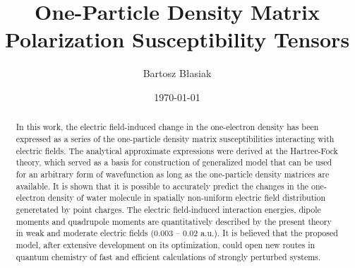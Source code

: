 \documentclass[aip,amsmath,amssymb,reprint,floatfix]{revtex4-1}
\begin{document}

\title{One-Particle Density Matrix Polarization Susceptibility Tensors}

\author{Bartosz B{\l}asiak}

\date{\today}

\begin{abstract}


In this work, the electric field\hyp{}induced change in the one\hyp{}electron density
has been expressed as a series of the one\hyp{}particle density matrix susceptibilities
interacting with electric fields. The analytical approximate expressions were derived
at the Hartree\hyp{}Fock theory, which served as a basis for construction of generalized
model that can be used for an arbitrary form of wavefunction as long as the one\hyp{}particle
density matrices are available. It is shown that it is possible to accurately predict the changes
in the one\hyp{}electron density of water molecule in spatially non\hyp{}uniform electric field distribution
generetated by point charges. The electric field\hyp{}induced interaction energies,
dipole moments and quadrupole moments
are quantitatively described by the present theory in weak and moderate electric fields (0.003 -- 0.02 a.u.).
It is believed that the proposed model, after extensive development on its optimization, could open
new routes in quantum chemistry of fast and efficient calculations of strongly perturbed systems.
\end{abstract}

\pacs{}%

\maketitle %
\end{document}

